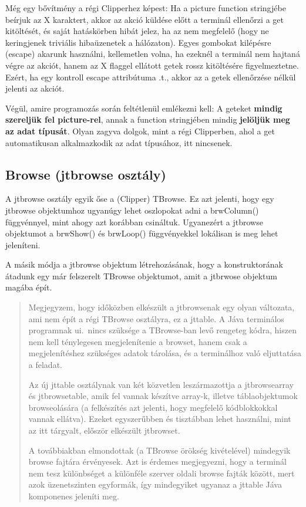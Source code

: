 Még egy bővítmény a régi Clipperhez képest: Ha a picture function
stringjébe beírjuk az X karaktert, akkor az akció küldése előtt
a terminál ellenőrzi a get kitöltését, és saját hatáskörben
hibát jelez, ha az nem megfelelő (hogy ne keringjenek triviális
hibaüzenetek a hálózaton). 
Egyes gombokat kilépésre (escape) akarunk használni, 
kellemetlen volna, ha ezeknél a terminál nem hajtaná végre az akciót, 
hanem az X flaggel ellátott getek rossz kitöltésére figyelmeztetne.
Ezért, ha egy kontroll escape attribútuma .t., akkor az a getek
ellenőrzése nélkül jelenti az akciót.

Végül, amire programozás során feltétlenül emlékezni kell: 
A geteket {\bf mindig szereljük fel picture-rel}, 
annak a function stringjében mindig {\bf jelöljük meg az adat típusát}. 
Olyan zagyva dolgok, mint a régi Clipperben, 
ahol a get automatikusan alkalmazkodik az adat típusához, itt nincsenek.
 

\subsection{Browse (jtbrowse osztály)}

A jtbrowse osztály egyik őse a (Clipper) TBrowse. 
Ez azt jelenti, hogy egy jtbrowse objektumhoz ugyanúgy lehet
oszlopokat adni a brwColumn() függvénnyel, mint ahogy azt
korábban csináltuk. Ugyanezért a jtbrowse objektumot a brwShow()
és brwLoop() függvényekkel lokálisan is meg lehet jeleníteni.

A másik módja a jtbrowse objektum létrehozásának,
hogy a konstruktorának átadunk egy már felszerelt TBrowse objektumot, 
amit a jtbrwose objektum magába épít.

\begin{quote}\small
   Megjegyzem, hogy időközben elkészült a jtbrowsenak egy olyan 
   változata, ami nem épít a régi TBrowse osztályra, ez a jttable. 
   A Jáva terminálos programnak ui.\ nincs szüksége a TBrowse-ban 
   levő rengeteg kódra, hiszen nem kell ténylegesen megjelenítenie
   a browset, hanem csak a megjelenítéshez szükséges adatok 
   tárolása, és a terminálhoz való eljuttatása a feladat. 
   
   Az új jttable osztálynak van két közvetlen leszármazottja
   a jtbrowsearray és jtbrowsetable, amik fel vannak készítve
   array-k, illetve táblaobjektumok browseolására (a felkészítés azt 
   jelenti, hogy megfelelő kódblokkokkal vannak ellátva).
   Ezeket egyszerűbben és tisztábban lehet használni,
   mint az itt tárgyalt, először elkészült jtbrowset.

   A továbbiakban elmondottak (a TBrowse örökség kivételével) 
   mindegyik browse fajtára érvényesek. Azt is érdemes megjegyezni,
   hogy a terminál nem tesz különbséget a különféle szerver oldali
   browse fajták között, mert azok üzenetszinten egyformák, 
   így mindegyiket ugyanaz a jttable  Jáva komponenes jeleníti meg.
\end{quote}


